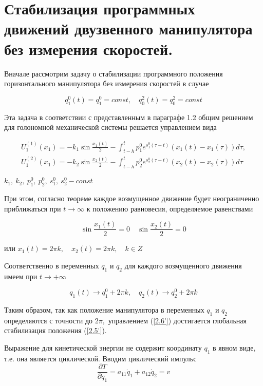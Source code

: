\section{Стабилизация программных движений двузвенного манипулятора без измерения скоростей.} \label{p22}

Вначале рассмотрим задачу о стабилизации программного положения горизонтального манипулятора без измерения скоростей в случае 

\begin{equation} \label{2.5'}
q^0_1 (t) = q^0_1 = const, \quad q^2_0 (t) = q^2_0 = const
\end{equation}

Эта задача в соответствии с представленным в параграфе 1.2 общим решением для голономной механической системы решается управлением вида 

\begin{equation} \label{2.6'}
\begin{array}{c}
\displaystyle U^{(1)}_1 (x_1) = - k_1 \sin \frac{x_1(t)}{2} - \int_{t-h}^t p_1^0 e^{s_1^0 (\tau - t)} (x_1 (t) - x_1 (\tau)) d \tau, \\ \displaystyle U^{(2)}_1 (x_1) = - k_2 \sin \frac{x_2(t)}{2} - \int_{t-h}^t p_2^0 e^{s_2^0 (\tau - t)} (x_2 (t) - x_2 (\tau)) d \tau
\end{array}
\end{equation}

$k_1, \ k_2, \ p_1^0, \ p_2^0, \ s_1^0, \ s_2^0 - const$

При этом, согласно теореме каждое возмущенное движение будет неограниченно приближаться при $t \to \infty$ к положению равновесия, определяемое равенствами 

$$\sin \frac{x_1(t)}{2} = 0 \quad \sin \frac{x_2(t)}{2} = 0$$

или $x_1(t) = 2 \pi k, \quad x_2(t) = 2 \pi k, \quad k \in Z$

Соответственно в переменных $q_1$ и $q_2$ для каждого возмущенного движения имеем при $t \to +\infty$ 

\begin{equation}
q_1 (t) \to q_1^0 + 2 \pi k, \quad q_2(t) \to q_2^0 + 2 \pi k
\end{equation}


Таким образом, так как положение манипулятора в переменных $q_1$ и $q_2$ определяются с точности до $2 \pi,$ управлением (\ref{2.6'}) достигается глобальная стабилизация положения (\ref{2.5'}).

Выражение для кинетической энергии не содержит координату $q_1$ в явном виде, т.е. она является циклической. Вводим циклический импульс $$\frac{\partial T}{\partial \dot q_1} = a_{11} \dot q_1 + a_{12} \dot q_2 = v$$

